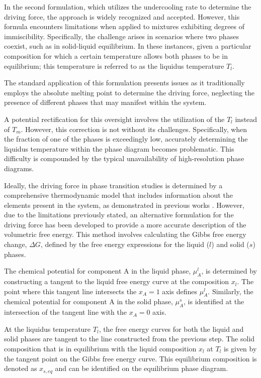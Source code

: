 In the second formulation, which utilizes the undercooling rate to determine the driving force, the approach is widely recognized and accepted. However, this formula encounters limitations when applied to mixtures exhibiting degrees of immiscibility. Specifically, the challenge arises in scenarios where two phases coexist, such as in solid-liquid equilibrium. In these instances, given a particular composition for which a certain temperature allows both phases to be in equilibrium; this temperature is referred to as the liquidus temperature \(T_l\).

The standard application of this formulation presents issues as it traditionally employs the absolute melting point to determine the driving force, neglecting the presence of different phases that may manifest within the system.

A potential rectification for this oversight involves the utilization of the \(T_l\) instead of \(T_m\). However, this correction is not without its challenges. Specifically, when the fraction of one of the phases is exceedingly low, accurately determining the liquidus temperature within the phase diagram becomes problematic. This difficulty is compounded by the typical unavailability of high-resolution phase diagrams.


Ideally, the driving force in phase transition studies is determined by a comprehensive thermodynamic model that includes information about the elements present in the system, as demonstrated in previous works \cite{Was1985, Kumar1996}. However, due to the limitations previously stated, an alternative formulation for the driving force has been developed to provide a more accurate description of the volumetric free energy. This method involves calculating the Gibbs free energy change, \(\Delta G\), defined by the free energy expressions for the liquid (\(l\)) and solid (\(s\)) phases.

The chemical potential for component A in the liquid phase, \(\mu_A^l\), is determined by constructing a tangent to the liquid free energy curve at the composition \(x_l\). The point where this tangent line intersects the \(x_A = 1\) axis defines \(\mu_A^l\). Similarly, the chemical potential for component A in the solid phase, \(\mu_A^s\), is identified at the intersection of the tangent line with the \(x_A = 0\) axis.

At the liquidus temperature \(T_l\), the free energy curves for both the liquid and solid phases are tangent to the line constructed from the previous step. The solid composition that is in equilibrium with the liquid composition \(x_l\) at \(T_l\) is given by the tangent point on the Gibbs free energy curve. This equilibrium composition is denoted as \(x_{s,eq}\) and can be identified on the equilibrium phase diagram.

